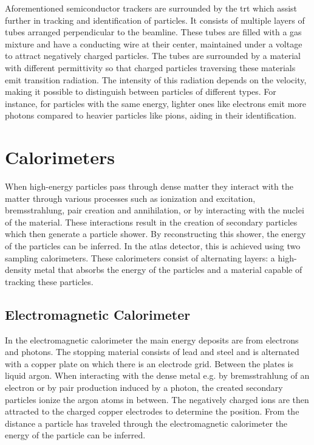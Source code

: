 Aforementioned semiconductor trackers are surrounded by the \ac{trt} which assist further in tracking and identification of particles. It consists of multiple layers of tubes arranged perpendicular to the beamline. These tubes are filled with a gas mixture and have a conducting wire at their center, maintained under a voltage to attract negatively charged particles. The tubes are surrounded by a material with different permittivity so that charged particles traversing these materials emit transition radiation. The intensity of this radiation depends on the velocity, making it possible to distinguish between particles of different types. For instance, for particles with the same energy, lighter ones like electrons emit more photons compared to heavier particles like pions, aiding in their identification.

\section{Calorimeters}\label{sec:calorimeters}
When high-energy particles pass through dense matter they interact with the matter through various processes such as ionization and excitation, bremsstrahlung, pair creation and annihilation, or by interacting with the nuclei of the material. These interactions result in the creation of secondary particles which then generate a particle shower. By reconstructing this shower, the energy of the particles can be inferred. In the \ac{atlas} detector, this is achieved using two sampling calorimeters. These calorimeters consist of alternating layers: a high-density metal that absorbs the energy of the particles and a material capable of tracking these particles.

\subsection{Electromagnetic Calorimeter}

In the electromagnetic calorimeter the main energy deposits are from electrons and photons. The stopping material consists of lead and steel and is alternated with a copper plate on which there is an electrode grid. Between the plates is liquid argon. When interacting with the dense metal e.g. by bremsstrahlung of an electron or by pair production induced by a photon, the created secondary particles ionize the argon atoms in between. The negatively charged ions are then attracted to the charged copper electrodes to determine the position. From the distance a particle has traveled through the electromagnetic calorimeter the energy of the particle can be inferred.

